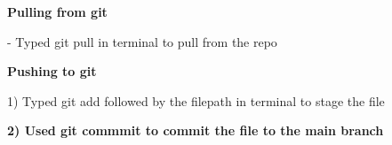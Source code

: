 \documentclass[../main.tex]{subfiles}
\begin{document}
\textbf{Pulling from git}

 \newline
 - Typed git pull in terminal to pull from the repo
\newline

\textbf{Pushing to git}
\newline

 1) Typed git add followed by the filepath in terminal to stage the file
 \newline

 \textbf{2) Used git commmit to commit the file to the main branch}
 \newline
\end{document}
